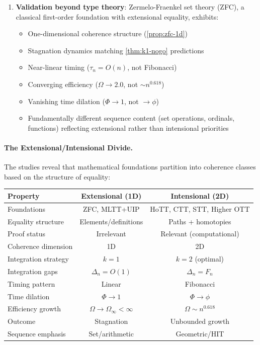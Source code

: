 \documentclass[11pt]{article}
\theoremstyle{definition}
\theoremstyle{remark}
\begin{document}
\begin{enumerate}
\item \textbf{Validation beyond type theory}: Zermelo-Fraenkel set theory (ZFC), a classical first-order foundation with extensional equality, exhibits:
\begin{itemize}
\item One-dimensional coherence structure (\cref{prop:zfc-1d})
\item Stagnation dynamics matching \cref{thm:k1-nogo} predictions
\item Near-linear timing ($\tau_n = O(n)$, not Fibonacci)
\item Converging efficiency ($\Omega \to 2.0$, not $\sim n^{0.618}$)
\item Vanishing time dilation ($\Phi \to 1$, not $\to \phi$)
\item Fundamentally different sequence content (set operations, ordinals, functions) reflecting extensional rather than intensional priorities
\end{itemize}
\end{enumerate}

\paragraph{The Extensional/Intensional Divide.}

The studies reveal that mathematical foundations partition into coherence classes based on the structure of equality:

\begin{center}
\begin{tabular}{lcc}
\hline
\textbf{Property} & \textbf{Extensional (1D)} & \textbf{Intensional (2D)} \\
\hline
Foundations & ZFC, MLTT+UIP & HoTT, CTT, STT, Higher OTT \\
Equality structure & Elements/definitions & Paths + homotopies \\
Proof status & Irrelevant & Relevant (computational) \\
Coherence dimension & 1D & 2D \\
Integration strategy & $k=1$ & $k=2$ (optimal) \\
Integration gaps & $\Delta_n = O(1)$ & $\Delta_n = F_n$ \\
Timing pattern & Linear & Fibonacci \\
Time dilation & $\Phi \to 1$ & $\Phi \to \phi$ \\
Efficiency growth & $\Omega \to \Omega_\infty < \infty$ & $\Omega \sim n^{0.618}$ \\
Outcome & Stagnation & Unbounded growth \\
Sequence emphasis & Set/arithmetic & Geometric/HIT \\
\hline
\end{tabular}
\end{center}
\end{document}
